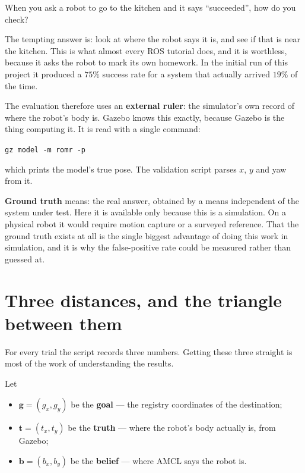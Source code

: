 \documentclass[11pt,a4paper]{report}
\newcommand{\term}[1]{\textcolor{rust}{\textbf{#1}}}
\newcommand{\file}[1]{\texttt{\small #1}}
\begin{document}
When you ask a robot to go to the kitchen and it says ``succeeded'', how do you
check?

The tempting answer is: look at where the robot says it is, and see if that is
near the kitchen. This is what almost every ROS tutorial does, and it is
worthless, because it asks the robot to mark its own homework. In the initial
run of this project it produced a $75\%$ success rate for a system that
actually arrived $19\%$ of the time.

The evaluation therefore uses an \term{external ruler}: the simulator's own
record of where the robot's body is. Gazebo knows this exactly, because Gazebo
is the thing computing it. It is read with a single command:
\begin{center}
\file{gz model -m romr -p}
\end{center}
which prints the model's true pose. The validation script parses $x$, $y$ and
yaw from it.

\begin{keyidea}
\term{Ground truth} means: the real answer, obtained by a means independent of
the system under test. Here it is available only because this is a simulation.
On a physical robot it would require motion capture or a surveyed reference.
That the ground truth exists at all is the single biggest advantage of doing
this work in simulation, and it is why the false-positive rate could be
measured rather than guessed at.
\end{keyidea}

\section{Three distances, and the triangle between them}

For every trial the script records three numbers. Getting these three straight
is most of the work of understanding the results.

Let
\begin{itemize}[leftmargin=1.4em,itemsep=1pt]
\item $\mathbf{g} = (g_x, g_y)$ be the \textbf{goal} --- the registry
coordinates of the destination;
\item $\mathbf{t} = (t_x, t_y)$ be the \textbf{truth} --- where the robot's
body actually is, from Gazebo;
\item $\mathbf{b} = (b_x, b_y)$ be the \textbf{belief} --- where AMCL says the
robot is.
\end{itemize}
\end{document}
